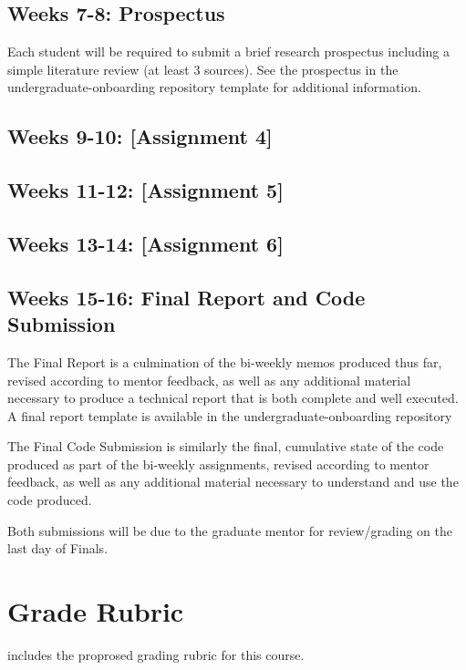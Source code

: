 \documentclass[12pt]{article}
\begin{document}
\subsection*{Weeks 7-8: Prospectus}

Each student will be required to submit a brief research prospectus including a simple literature review (at least 3 sources).  See the prospectus in the undergraduate-onboarding repository template for additional information.

\subsection*{Weeks 9-10: [Assignment 4]}

\subsection*{Weeks 11-12: [Assignment 5]}

\subsection*{Weeks 13-14: [Assignment 6]}

\subsection*{Weeks 15-16: Final Report and Code Submission}

The Final Report is a culmination of the bi-weekly memos produced thus far, revised according to mentor feedback, as well as any additional material necessary to produce a technical report that is both complete and well executed.  A final report template is available in the undergraduate-onboarding repository

The Final Code Submission is similarly the final, cumulative state of the code produced as part of the bi-weekly assignments, revised according to mentor feedback, as well as any additional material necessary to understand and use the code produced.

Both submissions will be due to the graduate mentor for review/grading on the last day of Finals.

\section*{Grade Rubric}

 includes the proprosed grading rubric for this course.
\end{document}
